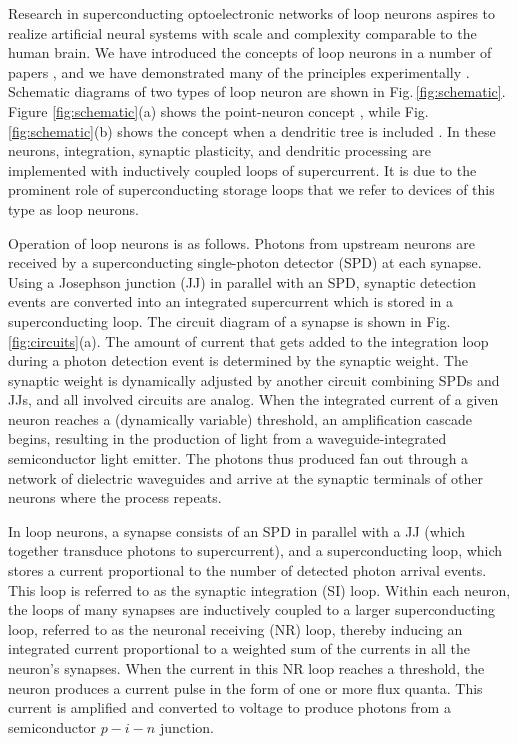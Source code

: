 \documentclass[twocolumn]{article}
\begin{document}
Research in superconducting optoelectronic networks of loop neurons aspires to realize artificial neural systems with scale and complexity comparable to the human brain. We have introduced the concepts of loop neurons in a number of papers \cite{sh2018,sh2019,sh2020}, and we have demonstrated many of the principles experimentally \cite{buch2017,chbu2017,chbu2018,mcve2019}. Schematic diagrams of two types of loop neuron are shown in Fig.\,\ref{fig:schematic}. Figure \ref{fig:schematic}(a) shows the point-neuron concept \cite{sh2018,sh2019_jap}, while Fig.\,\ref{fig:schematic}(b) shows the concept when a dendritic tree is included \cite{sh2019_jstqe}. In these neurons, integration, synaptic plasticity, and dendritic processing are implemented with inductively coupled loops of supercurrent. It is due to the prominent role of superconducting storage loops that we refer to devices of this type as loop neurons. 

Operation of loop neurons is as follows. Photons from upstream neurons are received by a superconducting single-photon detector (SPD) at each synapse. Using a Josephson junction (JJ) in parallel with an SPD, synaptic detection events are converted into an integrated supercurrent which is stored in a superconducting loop. The circuit diagram of a synapse is shown in Fig.\,\ref{fig:circuits}(a). The amount of current that gets added to the integration loop during a photon detection event is determined by the synaptic weight. The synaptic weight is dynamically adjusted by another circuit combining SPDs and JJs, and all involved circuits are analog. When the integrated current of a given neuron reaches a (dynamically variable) threshold, an amplification cascade begins, resulting in the production of light from a waveguide-integrated semiconductor light emitter. The photons thus produced fan out through a network of dielectric waveguides and arrive at the synaptic terminals of other neurons where the process repeats.

In loop neurons, a synapse consists of an SPD in parallel with a JJ (which together transduce photons to supercurrent), and a superconducting loop, which stores a current proportional to the number of detected photon arrival events. This loop is referred to as the synaptic integration (SI) loop. Within each neuron, the loops of many synapses are inductively coupled to a larger superconducting loop, referred to as the neuronal receiving (NR) loop, thereby inducing an integrated current proportional to a weighted sum of the currents in all the neuron's synapses. When the current in this NR loop reaches a threshold, the neuron produces a current pulse in the form of one or more flux quanta. This current is amplified and converted to voltage to produce photons from a semiconductor $p-i-n$ junction.
\end{document}
